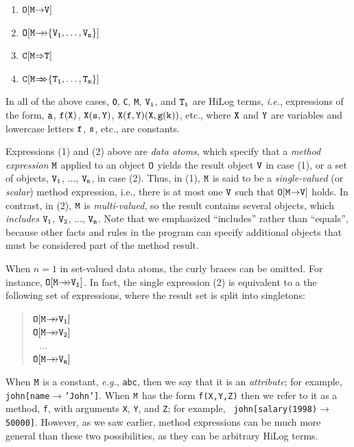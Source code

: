 \documentclass[11pt]{article}
\newcommand{\fd}{\ensuremath{{\rightarrow}}}                   %
\newcommand{\mvd}{\ensuremath{{\rightarrow\!\!\!\!\rightarrow}}}  %
\newcommand{\Fd}{\ensuremath{{\Rightarrow}}}                      %
\newcommand{\Mvd}{\ensuremath{{\Rightarrow\!\!\!\!\Rightarrow}}}  %
\begin{document}
\begin{itemize}
  \begin{enumerate}
    \item \label{eq-scalar-atom} $\tt O[M\fd V]$
    \item $\tt O[M\mvd \{V_1,\dots,V_n\}]$
    \item $\tt C[M\Fd T]$
    \item $\tt C[M\Mvd \{T_1,\dots,T_m\}]$
  \end{enumerate}
  
  In all of the above cases, {\tt O}, {\tt C}, {\tt M}, ${\tt V_i}$, and
  ${\tt T_i}$ are HiLog terms, {\it i.e.}, expressions of the form, $\tt a$,
  $\tt f(X)$, $\tt X(s,Y)$, $\tt X(f,Y)(X,g(k))$, etc., where $\tt X$
  and $\tt Y$ are variables and lowercase letters $\tt f$, $\tt s$, etc., are
  constants.
  
  Expressions (1) and (2) above are \emph{data atoms}, which specify that a
  \emph{method expression} $\tt M$ applied to an object $\tt O$ yields the
  result object $\tt V$ in case (1), or a set of objects, $\tt V_1$, ...,
  $\tt V_n$, in case (2). Thus, in (1), $\tt M$ is said to be a
  \emph{single-valued} (or \emph{scalar}) method expression, i.e., there is
  at most one $\tt V$ such that $\tt O[M\fd V]$ holds.  In contrast, in (2),
  $\tt M$ is \emph{multi-valued}, so the result contains several objects,
  which \emph{includes} $\tt V_1$, $\tt V_2$, ..., $\tt V_n$. Note that we
  emphasized ``includes'' rather than ``equals'', because other facts and
  rules in the program can specify additional objects that must be
  considered part of the method result.
  
  When $n=1$ in set-valued data atoms, the curly braces can be omitted. For
  instance, $\tt O[M\mvd V_1]$. In fact, the single expression (2) is
  equivalent to a the following set of expressions, where the result set is
  split into singletons:
  \begin{quote}
  $\tt O[M\mvd V_1]$    \\
  $\tt O[M\mvd V_2]$    \\
  $~~~\dots$\\
  $\tt O[M\mvd V_n]$
  \end{quote}
  
  When $\tt M$ is a constant, {\it e.g.}, {\tt abc}, then we say that it is
  an \emph{attribute}; for example, {\tt john[name\fd 'John']}. When $\tt
  M$ has the form {\tt f(X,Y,Z)} then we refer to it as a method, {\tt f},
  with arguments {\tt X}, {\tt Y}, and {\tt Z}; for example, {\tt
  john[salary(1998)\fd 50000]}.  However, as we saw
  earlier, method expressions can be much more general than these two
  possibilities, as they can be arbitrary HiLog terms.



\end{itemize}
\end{document}
